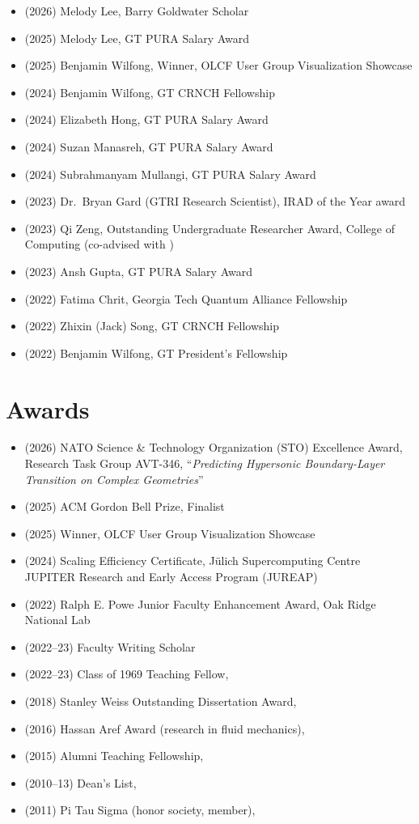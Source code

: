\begin{itemize}
    \item (2026) Melody Lee, Barry Goldwater Scholar
    \item (2025) Melody Lee, GT PURA Salary Award
    \item (2025) Benjamin Wilfong, Winner, OLCF User Group Visualization Showcase
    \item (2024) Benjamin Wilfong, GT CRNCH Fellowship
    \item (2024) Elizabeth Hong, GT PURA Salary Award
    \item (2024) Suzan Manasreh, GT PURA Salary Award
    \item (2024) Subrahmanyam Mullangi, GT PURA Salary Award
    \item (2023) Dr.\ Bryan Gard (GTRI Research Scientist), IRAD of the Year award
    \item (2023) Qi Zeng, Outstanding Undergraduate Researcher Award, College of Computing (co-advised with \Florian)
    \item (2023) Ansh Gupta, GT PURA Salary Award
    \item (2022) Fatima Chrit, Georgia Tech Quantum Alliance Fellowship
    \item (2022) Zhixin (Jack) Song, GT CRNCH Fellowship
    \item (2022) Benjamin Wilfong, GT President's Fellowship
\end{itemize}

\section{Awards}

\begin{itemize}
    \item (2026) NATO Science \& Technology Organization (STO) Excellence Award, Research Task Group AVT-346, ``\textit{Predicting Hypersonic Boundary-Layer Transition on Complex Geometries}''
    \item (2025) ACM Gordon Bell Prize, Finalist
    \item (2025) Winner, OLCF User Group Visualization Showcase
    \item (2024) Scaling Efficiency Certificate, J\"ulich Supercomputing Centre JUPITER Research and Early Access Program (JUREAP)
    \item (2022) Ralph E. Powe Junior Faculty Enhancement Award, Oak Ridge National Lab
    \item (2022--23) \GT Faculty Writing Scholar
    \item (2022--23) Class of 1969 Teaching Fellow, \GIT
    \item (2018) Stanley Weiss Outstanding Dissertation Award, \UIUC
    \item (2016) Hassan Aref Award (research in fluid mechanics), \UIUC
    \item (2015) Alumni Teaching Fellowship, \UIUC
    \item (2010--13) Dean's List, \UMD
    \item (2011) Pi Tau Sigma (honor society, member), \UMD
\end{itemize}

